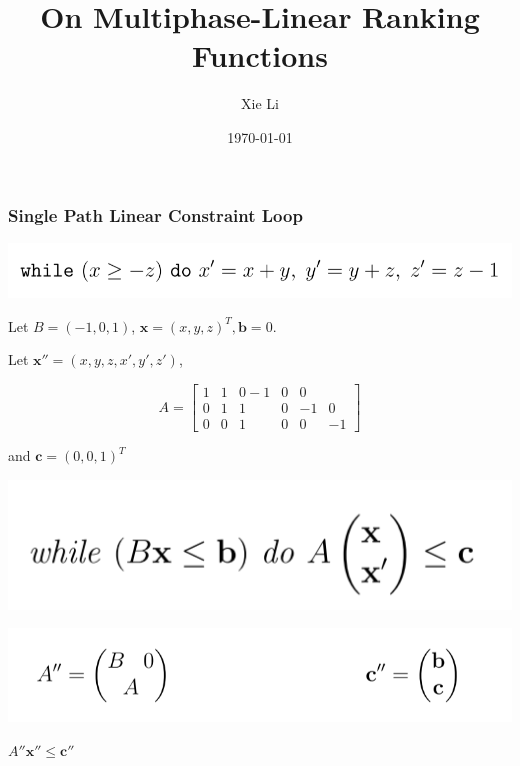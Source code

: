 \documentclass[11pt]{beamer}
\title{On Multiphase-Linear Ranking Functions}
\date{\today}
\author{Xie Li}
\begin{document}
\maketitle


\begin{frame}\frametitle{Single Path Linear Constraint Loop}{\scriptsize
\begin{example}
\begin{center}

\includegraphics[scale = 0.4]{loopExample.png}


\end{center}


Let $B = (-1, 0, 1)$, $\textbf{x} = (x, y, z)^T, \textbf{b} = 0$.

Let $\textbf{x}'' = (x, y, z, x', y', z')$, 

\begin{equation}
A = \left[
\begin{array}{cccccc}
     1 &1 &0 -1 & 0 & 0 \\
     0 & 1 & 1 & 0 & -1 & 0 \\
     0& 0 & 1 & 0 & 0 & -1
\end{array}
\right]
\end{equation}

and $\textbf{c} = (0, 0, 1)^T$


\end{example}




\begin{definition}[SLC]
\includegraphics[scale = 0.28]{1.PNG}


\end{definition}
\begin{center}
\includegraphics[scale = 0.25]{2.PNG}

$A''\textbf{x}'' \le \textbf{c}''$
\end{center}
}
\end{frame}
\end{document}
